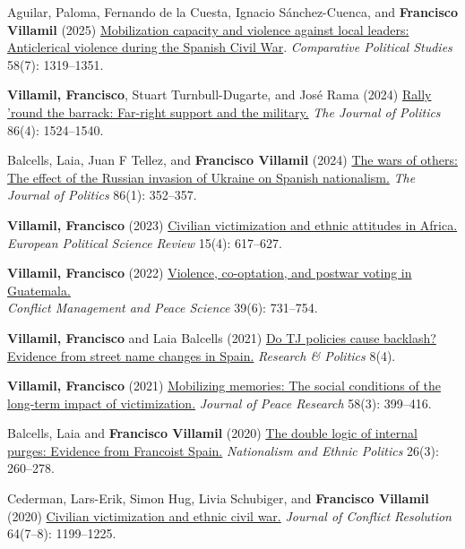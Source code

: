 \documentclass[a4paper, 12pt]{article}
\begin{document}
\begin{etaremune}[leftmargin=12pt, itemsep=0pt]
\item Aguilar, Paloma, Fernando de la Cuesta, Ignacio Sánchez-Cuenca, and \textbf{Francisco Villamil} (2025) \href{https://doi.org/10.1177/00104140241269894}{Mobilization capacity and violence against local leaders: Anticlerical violence during the Spanish Civil War}. \textit{Comparative Political Studies} 58(7): 1319--1351.
\item \textbf{Villamil, Francisco}, Stuart Turnbull-Dugarte, and José Rama (2024) \href{https://doi.org/10.1086/727598}{Rally 'round the barrack: Far-right support and the military.} \textit{The Journal of Politics} 86(4): 1524--1540.
\item Balcells, Laia, Juan F Tellez, and \textbf{Francisco Villamil} (2024) \href{https://doi.org/10.1086/726939}{The wars of others: The effect of the Russian invasion of Ukraine on Spanish nationalism.} \textit{The Journal of Politics} 86(1): 352--357.
\item \textbf{Villamil, Francisco} (2023) \href{https://doi.org/10.1017/S1755773923000097}{Civilian victimization and ethnic attitudes in Africa.}\\\textit{European Political Science Review} 15(4): 617--627.
\item \textbf{Villamil, Francisco} (2022) \href{https://journals.sagepub.com/doi/full/10.1177/07388942211066539}{Violence, co-optation, and postwar voting in Guatemala.}\\\textit{Conflict Management and Peace Science} 39(6): 731--754.
\item \textbf{Villamil, Francisco} and Laia Balcells (2021) \href{https://journals.sagepub.com/doi/full/10.1177/20531680211058550}{Do TJ policies cause backlash? Evidence from street name changes in Spain.} \textit{Research \& Politics} 8(4).
\item \textbf{Villamil, Francisco} (2021) \href{https://doi.org/10.1177/0022343320912816}{Mobilizing memories: The social conditions of the long-term impact of victimization.} \textit{Journal of Peace Research} 58(3): 399--416.
\item Balcells, Laia and \textbf{Francisco Villamil} (2020) \href{https://doi.org/10.1080/13537113.2020.1795451}{The double logic of internal purges: Evidence from Francoist Spain.} \textit{Nationalism and Ethnic Politics} 26(3): 260--278.
\item Cederman, Lars-Erik, Simon Hug, Livia Schubiger, and \textbf{Francisco Villamil} (2020) \href{https://doi.org/10.1177/0022002719898873}{Civilian victimization and ethnic civil war.} \textit{Journal of Conflict Resolution} 64(7--8): 1199--1225.
\end{etaremune}
\end{document}
